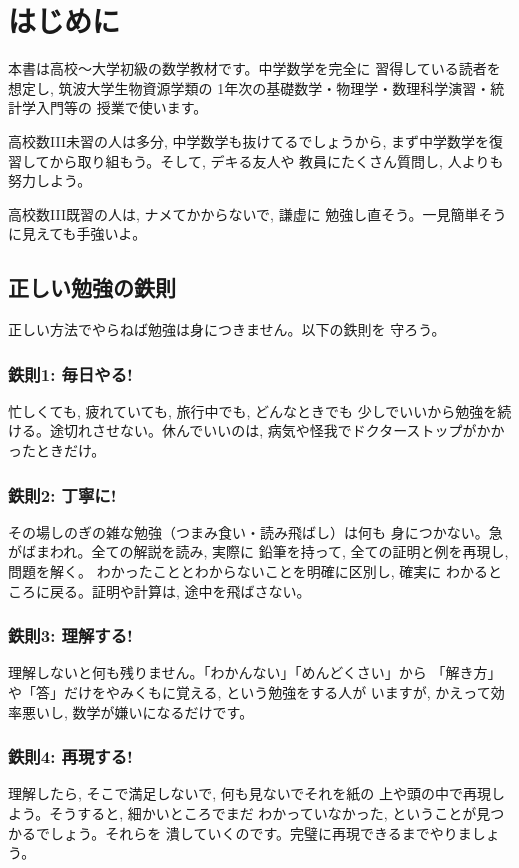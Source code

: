 \chapter{はじめに}

本書は高校〜大学初級の数学教材です。中学数学を完全に
習得している読者を想定し, 筑波大学生物資源学類の
1年次の基礎数学・物理学・数理科学演習・統計学入門等の
授業で使います。

高校数III未習の人は多分, 中学数学も抜けてるでしょうから, 
まず中学数学を復習してから取り組もう。そして, デキる友人や
教員にたくさん質問し, 人よりも努力しよう。

高校数III既習の人は, ナメてかからないで, 謙虚に
勉強し直そう。一見簡単そうに見えても手強いよ。

\section*{正しい勉強の鉄則}

正しい方法でやらねば勉強は身につきません。以下の鉄則を
守ろう。\\

\subsection*{鉄則1: 毎日やる!}
忙しくても, 疲れていても, 旅行中でも, どんなときでも
少しでいいから勉強を続ける。途切れさせない。休んでいいのは, 
病気や怪我でドクターストップがかかったときだけ。\\

\subsection*{鉄則2: 丁寧に!}
その場しのぎの雑な勉強（つまみ食い・読み飛ばし）は何も
身につかない。急がばまわれ。全ての解説を読み, 実際に
鉛筆を持って, 全ての証明と例を再現し, 問題を解く。
わかったこととわからないことを明確に区別し, 確実に
わかるところに戻る。証明や計算は, 途中を飛ばさない。\\

\subsection*{鉄則3: 理解する!}
理解しないと何も残りません。「わかんない」「めんどくさい」から
「解き方」や「答」だけをやみくもに覚える, という勉強をする人が
いますが, かえって効率悪いし, 数学が嫌いになるだけです。\\

\subsection*{鉄則4: 再現する!}
理解したら, そこで満足しないで, 何も見ないでそれを紙の
上や頭の中で再現しよう。そうすると, 細かいところでまだ
わかっていなかった, ということが見つかるでしょう。それらを
潰していくのです。完璧に再現できるまでやりましょう。\\

